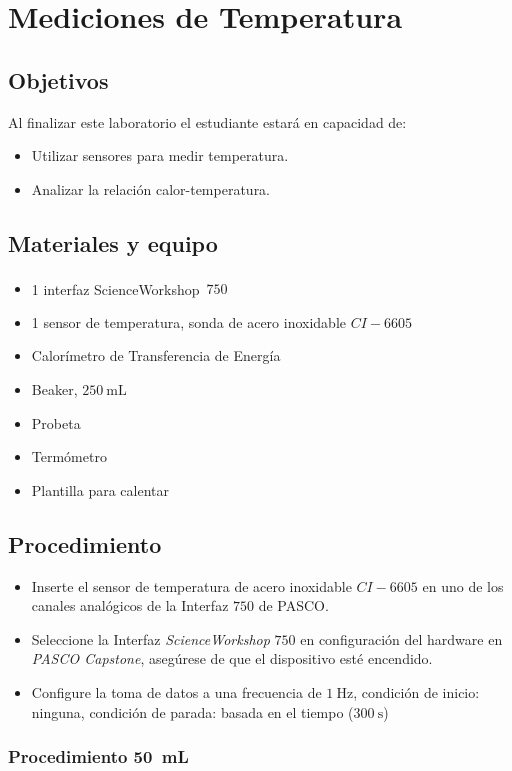 \documentclass[12pt,letterpaper]{report}
\newcommand{\obj}{Objetivos}
\newcommand{\mat}{Materiales y equipo}
\newcommand{\pro}{Procedimiento}
\newcommand{\capacidad}{Al finalizar este laboratorio el estudiante estará en capacidad de:}
\begin{document}
\chapter{Mediciones de Temperatura}
\section{\obj}
\capacidad
\begin{itemize}
\item Utilizar sensores para medir temperatura.
\item Analizar la relación calor-temperatura.
\end{itemize}
\section{\mat}
\begin{itemize}
\item 1 interfaz ScienceWorkshop\,\textsuperscript{\textregistered} $750$
\item 1 sensor de temperatura, sonda de acero inoxidable $CI-6605$
\item Calorímetro de Transferencia de Energía
\item Beaker, $\SI{250}{\milli\liter}$
\item Probeta
\item Termómetro
\item Plantilla para calentar
\end{itemize}
\section{\pro}
\begin{itemize}
    \item Inserte el sensor de temperatura de acero inoxidable $CI-6605$ en uno de los canales analógicos de la Interfaz $750$ de PASCO.
    \item Seleccione la Interfaz \textit{ScienceWorkshop} $750$ en configuración del hardware en \textit{PASCO Capstone}, asegúrese de que el dispositivo esté encendido.
    \item Configure la toma de datos a una frecuencia de $\SI{1}{\hertz}$, condición de inicio: ninguna, condición de parada: basada en el tiempo ($\SI{300}{\second}$) 
\end{itemize}
\subsection{Procedimiento \SI{50}{\milli\liter}}
\end{document}
